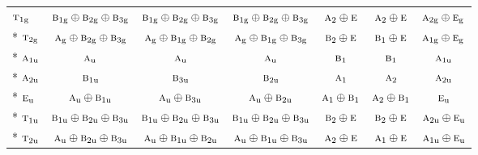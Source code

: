 \documentclass[10pt,a4paper]{article}
\numberwithin{equation}{section}
\newcommand{\irr}[1]{\text{\normalfont\scshape #1}}
\newcommand{\ptag}[1]{\mathrm{#1}}
\begin{document}
{\begin{longtable}{@{}lcccccc@{}}
$\irr{t}_{1\ptag{g}}$ & $\irr{b}_{1\ptag{g}}\oplus \irr{b}_{2\ptag{g}}\oplus \irr{b}_{3\ptag{g}}$ & $\irr{b}_{1\ptag{g}}\oplus \irr{b}_{2\ptag{g}}\oplus \irr{b}_{3\ptag{g}}$ & $\irr{b}_{1\ptag{g}}\oplus \irr{b}_{2\ptag{g}}\oplus \irr{b}_{3\ptag{g}}$ & $\irr{a}_{2}\oplus \irr{e}$ & $\irr{a}_{2}\oplus \irr{e}$ & $\irr{a}_{2\ptag{g}}\oplus \irr{e}_{\ptag{g}}$\\*
$\irr{t}_{2\ptag{g}}$ & $\irr{a}_{\ptag{g}}\oplus \irr{b}_{2\ptag{g}}\oplus \irr{b}_{3\ptag{g}}$ & $\irr{a}_{\ptag{g}}\oplus \irr{b}_{1\ptag{g}}\oplus \irr{b}_{2\ptag{g}}$ & $\irr{a}_{\ptag{g}}\oplus \irr{b}_{1\ptag{g}}\oplus \irr{b}_{3\ptag{g}}$ & $\irr{b}_{2}\oplus \irr{e}$ & $\irr{b}_{1}\oplus \irr{e}$ & $\irr{a}_{1\ptag{g}}\oplus \irr{e}_{\ptag{g}}$\\*
$\irr{a}_{1\ptag{u}}$ & $\irr{a}_{\ptag{u}}$ & $\irr{a}_{\ptag{u}}$ & $\irr{a}_{\ptag{u}}$ & $\irr{b}_{1}$ & $\irr{b}_{1}$ & $\irr{a}_{1\ptag{u}}$\\*
$\irr{a}_{2\ptag{u}}$ & $\irr{b}_{1\ptag{u}}$ & $\irr{b}_{3\ptag{u}}$ & $\irr{b}_{2\ptag{u}}$ & $\irr{a}_{1}$ & $\irr{a}_{2}$ & $\irr{a}_{2\ptag{u}}$\\*
$\irr{e}_{\ptag{u}}$ & $\irr{a}_{\ptag{u}}\oplus \irr{b}_{1\ptag{u}}$ & $\irr{a}_{\ptag{u}}\oplus \irr{b}_{3\ptag{u}}$ & $\irr{a}_{\ptag{u}}\oplus \irr{b}_{2\ptag{u}}$ & $\irr{a}_{1}\oplus \irr{b}_{1}$ & $\irr{a}_{2}\oplus \irr{b}_{1}$ & $\irr{e}_{\ptag{u}}$\\*
$\irr{t}_{1\ptag{u}}$ & $\irr{b}_{1\ptag{u}}\oplus \irr{b}_{2\ptag{u}}\oplus \irr{b}_{3\ptag{u}}$ & $\irr{b}_{1\ptag{u}}\oplus \irr{b}_{2\ptag{u}}\oplus \irr{b}_{3\ptag{u}}$ & $\irr{b}_{1\ptag{u}}\oplus \irr{b}_{2\ptag{u}}\oplus \irr{b}_{3\ptag{u}}$ & $\irr{b}_{2}\oplus \irr{e}$ & $\irr{b}_{2}\oplus \irr{e}$ & $\irr{a}_{2\ptag{u}}\oplus \irr{e}_{\ptag{u}}$\\*
$\irr{t}_{2\ptag{u}}$ & $\irr{a}_{\ptag{u}}\oplus \irr{b}_{2\ptag{u}}\oplus \irr{b}_{3\ptag{u}}$ & $\irr{a}_{\ptag{u}}\oplus \irr{b}_{1\ptag{u}}\oplus \irr{b}_{2\ptag{u}}$ & $\irr{a}_{\ptag{u}}\oplus \irr{b}_{1\ptag{u}}\oplus \irr{b}_{3\ptag{u}}$ & $\irr{a}_{2}\oplus \irr{e}$ & $\irr{a}_{1}\oplus \irr{e}$ & $\irr{a}_{1\ptag{u}}\oplus \irr{e}_{\ptag{u}}$\\
\bottomrule\end{longtable}}
\end{document}
